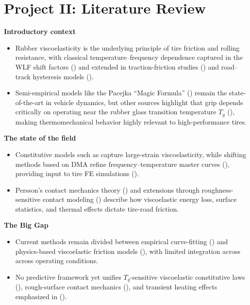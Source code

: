 \section*{Project II: Literature Review}

\textbf{Introductory context}
\begin{itemize}
    \item Rubber viscoelasticity is the underlying principle of tire friction and rolling resistance, with classical temperature–frequency dependence captured in the WLF shift factors (\cite{Williams_Landel_Ferry_1955}) and extended in traction-friction studies (\cite{Grosch_2007}) and road–track hysteresis models (\cite{kluppel-heinrichRubberFrictionSelfAffineRoad2000}).
    \item Semi-empirical models like the Pacejka “Magic Formula” (\cite{pacejkaMagicFormula1992}) remain the state-of-the-art in vehicle dynamics, but other sources highlight that grip depends critically on operating near the rubber glass transition temperature $T_g$ (\cite{Haney_2003}), making thermomechanical behavior highly relevant to high-performance tires.
\end{itemize}

\textbf{The state of the field}
\begin{itemize}
    \item Constitutive models such as \cite{bergstrom-boyceConstModelLargeStrain1998} capture large-strain viscoelasticity, while shifting methods based on DMA refine frequency–temperature master curves (\cite{Lorenz_Pyckhout-Hintzen_Persson_2014}), providing input to tire FE simulations (\cite{Salehi_Noordermeer_Reuvekamp_Blume_2021}).
    \item Persson’s contact mechanics theory (\cite{perssonRubberFrictionContactMech2001}) and extensions through roughness-sensitive contact modeling (\cite{Putignano_Afferrante_Carbone_Demelio_2012, Carbone_Putignano_2014}) describe how viscoelastic energy loss, surface statistics, and thermal effects dictate tire-road friction.
\end{itemize}

\textbf{The Big Gap}
\begin{itemize}
    \item Current methods remain divided between empirical curve-fitting (\cite{pacejkaMagicFormula1992, Salehi_Noordermeer_Reuvekamp_Blume_2021}) and physics-based viscoelastic friction models (\cite{perssonRubberFrictionContactMech2001, Carbone_Putignano_2014}), with limited integration across across operating conditions.
    \item No predictive framework yet unifies $T_g$-sensitive viscoelastic constitutive laws (\cite{bergstrom-boyceConstModelLargeStrain1998, Lorenz_Pyckhout-Hintzen_Persson_2014}), rough-surface contact mechanics (\cite{Putignano_Afferrante_Carbone_Demelio_2012}), and transient heating effects emphasized in (\cite{Haney_2003}).
\end{itemize}